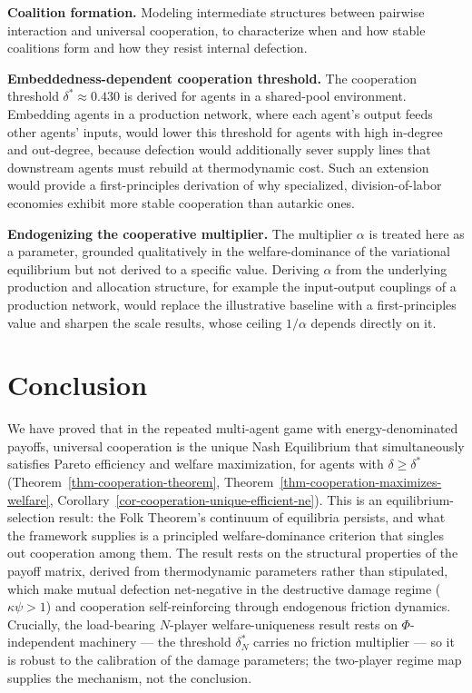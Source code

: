 \documentclass[11pt]{article}
\theoremstyle{plain}
\theoremstyle{definition}
\theoremstyle{remark}
\let\origsection\section
\renewcommand{\section}{\needspace{12\baselineskip}\origsection}
\begin{document}
\textbf{Coalition formation.} Modeling intermediate structures between
pairwise interaction and universal cooperation, to characterize when and
how stable coalitions form and how they resist internal defection.

\textbf{Embeddedness-dependent cooperation threshold.} The cooperation
threshold \(\delta^* \approx 0.430\) is derived for agents in a
shared-pool environment. Embedding agents in a production network, where
each agent's output feeds other agents' inputs, would lower this
threshold for agents with high in-degree and out-degree, because
defection would additionally sever supply lines that downstream agents
must rebuild at thermodynamic cost. Such an extension would provide a
first-principles derivation of why specialized, division-of-labor
economies exhibit more stable cooperation than autarkic ones.

\textbf{Endogenizing the cooperative multiplier.} The multiplier
\(\alpha\) is treated here as a parameter, grounded qualitatively in the
welfare-dominance of the variational equilibrium \citep{TC-I} but not
derived to a specific value. Deriving \(\alpha\) from the underlying
production and allocation structure, for example the input-output
couplings of a production network, would replace the illustrative
baseline with a first-principles value and sharpen the scale results,
whose ceiling \(1/\alpha\) depends directly on it.

\section{Conclusion}\label{conclusion}

We have proved that in the repeated multi-agent game with
energy-denominated payoffs, universal cooperation is the unique Nash
Equilibrium that simultaneously satisfies Pareto efficiency and welfare
maximization, for agents with \(\delta \geq \delta^*\)
(Theorem~\ref{thm-cooperation-theorem},
Theorem~\ref{thm-cooperation-maximizes-welfare},
Corollary~\ref{cor-cooperation-unique-efficient-ne}). This is an
equilibrium-selection result: the Folk Theorem's continuum of equilibria
persists, and what the framework supplies is a principled
welfare-dominance criterion that singles out cooperation among them. The
result rests on the structural properties of the payoff matrix, derived
from thermodynamic parameters rather than stipulated, which make mutual
defection net-negative in the destructive damage regime
(\(\kappa\psi > 1\)) and cooperation self-reinforcing through endogenous
friction dynamics. Crucially, the load-bearing \(N\)-player
welfare-uniqueness result rests on \(\Phi\)-independent machinery ---
the threshold \(\delta_N^*\) carries no friction multiplier --- so it is
robust to the calibration of the damage parameters; the two-player
regime map supplies the mechanism, not the conclusion.
\end{document}
